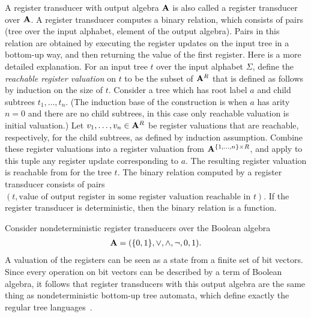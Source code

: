 A register transducer with output algebra  $\mathbf{A}$ is also called  a register transducer over $\mathbf{A}$.
A  register transducer computes a binary relation, which consists of pairs 
    (tree over the input alphabet, element of the output algebra).
Pairs in this relation are obtained by  executing the register updates on the input tree in a bottom-up way, and then returning the value of the first register. Here is a more detailed explanation.  For an input  tree $t$ over the input alphabet $\Sigma$, define the \emph{reachable register valuation} on $t$ to be the subset  of $\mathbf{A}^R$ that is  defined as follows by  induction on the size of $t$. Consider a tree which has root label $a$ and child subtrees $t_1,\ldots,t_n$. (The induction base of the construction is when $a$ has arity $n=0$ and there are no child subtrees, in this case only reachable valuation is initial valuation.) Let $v_1,\ldots,v_n \in \mathbf{A}^R$ be  register valuations that are reachable, respectively,  for the child subtrees, as defined by induction assumption. Combine these register valuations into a register valuation from $\mathbf{A}^{\{1,\ldots,n\} \times R}$, and apply to this tuple any register update corresponding to $a$. The resulting register valuation is reachable from for the tree $t$. The binary relation computed by a register transducer consists of pairs $(t,\text{value of output register in  some register valuation reachable in $t$})$. If the register transducer is deterministic, then the binary relation is a function. 

\begin{example}
    Consider nondeterministic register transducers over the Boolean algebra
    \begin{align*}
    \mathbf{A} = (\{0,1\},\lor, \land, \neg, 0, 1).
    \end{align*}
    A valuation of the registers can be seen as a state from a finite set of bit vectors. Since every operation on bit vectors can be described  by a term of Boolean algebra, it follows that  register transducers with this output algebra are the same thing as  nondeterministic bottom-up tree automata, which define exactly the regular tree languages~\cite[Section 2]{thatcherGeneralizedFiniteAutomata1968}. 
\end{example}

